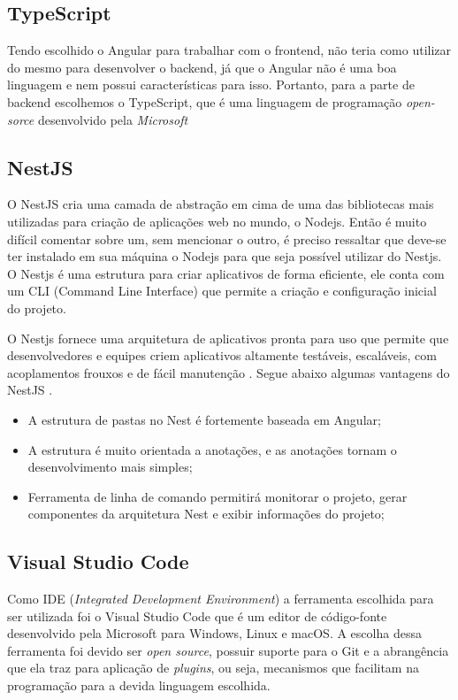 \subsection{TypeScript}
Tendo escolhido o Angular para trabalhar com o frontend, não teria como utilizar do mesmo para desenvolver o backend, já que o Angular não é uma boa linguagem e nem possui características para isso. Portanto, para a parte de backend escolhemos o TypeScript, que é uma linguagem de programação \textit{open-sorce} desenvolvido pela \textit{Microsoft} 

\subsection{NestJS}
O NestJS cria uma camada de abstração em cima de uma das bibliotecas mais utilizadas para criação de aplicações web no mundo, o Nodejs.  Então é muito difícil comentar sobre um, sem mencionar o outro, é preciso ressaltar que deve-se ter instalado em sua máquina o Nodejs para que seja possível utilizar do Nestjs. O Nestjs é uma estrutura para criar aplicativos de forma eficiente, ele conta com um CLI (Command Line Interface) que permite a criação e configuração inicial do projeto.

O Nestjs fornece uma arquitetura de aplicativos pronta para uso que permite que desenvolvedores e equipes criem aplicativos altamente testáveis, escaláveis, com acoplamentos frouxos e de fácil manutenção \cite{kamil2020nestjs}. Segue abaixo algumas vantagens do NestJS .

\begin{itemize}
    \item A estrutura de pastas no Nest é fortemente baseada em Angular; 
    \item A estrutura é muito orientada a anotações, e as anotações tornam o desenvolvimento mais simples;   
    \item Ferramenta de linha de comando permitirá monitorar o projeto, gerar componentes da arquitetura Nest e exibir informações do projeto;   
\end{itemize}

\subsection{Visual Studio Code}
Como IDE (\textit{Integrated Development Environment}) a ferramenta escolhida para ser utilizada foi o Visual Studio Code que é um editor de código-fonte desenvolvido pela Microsoft para Windows, Linux e macOS. A escolha dessa ferramenta foi devido ser \textit{open source}, possuir suporte para o Git e a abrangência que ela traz para aplicação de \textit{plugins}, ou seja, mecanismos que facilitam na programação para a devida linguagem escolhida.

